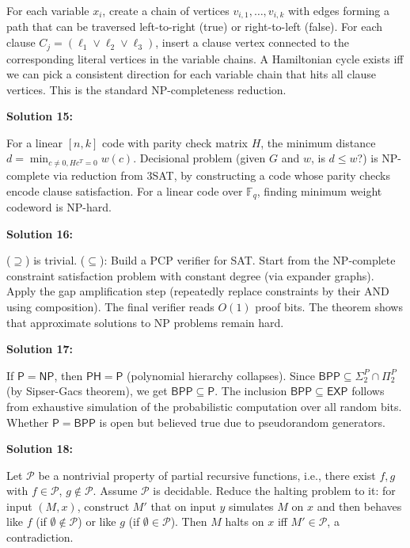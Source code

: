 \documentclass[12pt,a4paper]{exam}
\begin{document}
For each variable $x_i$, create a chain of vertices $v_{i,1}, \ldots, v_{i,k}$ with edges forming a path that can be traversed left-to-right (true) or right-to-left (false). For each clause $C_j = (\ell_1 \lor \ell_2 \lor \ell_3)$, insert a clause vertex connected to the corresponding literal vertices in the variable chains. A Hamiltonian cycle exists iff we can pick a consistent direction for each variable chain that hits all clause vertices. This is the standard NP-completeness reduction.

\vspace{0.5cm}

\textbf{Solution 15:}

For a linear $[n,k]$ code with parity check matrix $H$, the minimum distance $d = \min_{c \neq 0, Hc^T=0} w(c)$. Decisional problem (given $G$ and $w$, is $d \leq w$?) is NP-complete via reduction from 3SAT, by constructing a code whose parity checks encode clause satisfaction. For a linear code over $\mathbb{F}_q$, finding minimum weight codeword is NP-hard.

\vspace{0.5cm}

\textbf{Solution 16:}

($\supseteq$) is trivial. ($\subseteq$): Build a PCP verifier for SAT. Start from the NP-complete constraint satisfaction problem with constant degree (via expander graphs). Apply the gap amplification step (repeatedly replace constraints by their AND using composition). The final verifier reads $O(1)$ proof bits. The theorem shows that approximate solutions to NP problems remain hard.

\vspace{0.5cm}

\textbf{Solution 17:}

If $\mathsf{P} = \mathsf{NP}$, then $\mathsf{PH} = \mathsf{P}$ (polynomial hierarchy collapses). Since $\mathsf{BPP} \subseteq \Sigma_2^P \cap \Pi_2^P$ (by Sipser-Gacs theorem), we get $\mathsf{BPP} \subseteq \mathsf{P}$. The inclusion $\mathsf{BPP} \subseteq \mathsf{EXP}$ follows from exhaustive simulation of the probabilistic computation over all random bits. Whether $\mathsf{P} = \mathsf{BPP}$ is open but believed true due to pseudorandom generators.

\vspace{0.5cm}

\textbf{Solution 18:}

Let $\mathcal{P}$ be a nontrivial property of partial recursive functions, i.e., there exist $f,g$ with $f \in \mathcal{P}$, $g \notin \mathcal{P}$. Assume $\mathcal{P}$ is decidable. Reduce the halting problem to it: for input $(M,x)$, construct $M'$ that on input $y$ simulates $M$ on $x$ and then behaves like $f$ (if $\emptyset \notin \mathcal{P}$) or like $g$ (if $\emptyset \in \mathcal{P}$). Then $M$ halts on $x$ iff $M' \in \mathcal{P}$, a contradiction.
\end{document}
